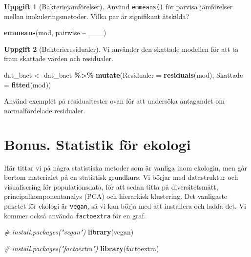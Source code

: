 \documentclass[
]{book}
\newenvironment{Shaded}{\begin{snugshade}}{\end{snugshade}}
\newcommand{\AttributeTok}[1]{\textcolor[rgb]{0.13,0.29,0.53}{#1}}
\newcommand{\CommentTok}[1]{\textcolor[rgb]{0.56,0.35,0.01}{\textit{#1}}}
\newcommand{\FunctionTok}[1]{\textcolor[rgb]{0.13,0.29,0.53}{\textbf{#1}}}
\newcommand{\NormalTok}[1]{#1}
\newcommand{\OtherTok}[1]{\textcolor[rgb]{0.56,0.35,0.01}{#1}}
\newcommand{\SpecialCharTok}[1]{\textcolor[rgb]{0.81,0.36,0.00}{\textbf{#1}}}
\theoremstyle{definition}
\theoremstyle{definition}
\theoremstyle{definition}
\newtheorem{exercise}{Uppgift}[chapter]
\theoremstyle{definition}
\theoremstyle{remark}
\begin{document}
\begin{exercise}[Bakteriejämförelser]

Använd \texttt{emmeans()} för parvisa jämförelser mellan inokuleringsmetoder. Vilka par är signifikant åtskilda?

\begin{Shaded}
\begin{Highlighting}[]
\FunctionTok{emmeans}\NormalTok{(mod, pairwise }\SpecialCharTok{\textasciitilde{}}\NormalTok{ \_\_\_)}
\end{Highlighting}
\end{Shaded}

\end{exercise}

\begin{exercise}[Bakterieresidualer]
Vi använder den skattade modellen för att ta fram skattade värden och residualer.

\begin{Shaded}
\begin{Highlighting}[]
\NormalTok{dat\_bact }\OtherTok{\textless{}{-}}\NormalTok{ dat\_bact }\SpecialCharTok{\%\textgreater{}\%} 
  \FunctionTok{mutate}\NormalTok{(}\AttributeTok{Residualer =} \FunctionTok{residuals}\NormalTok{(mod),}
         \AttributeTok{Skattade =} \FunctionTok{fitted}\NormalTok{(mod))}
\end{Highlighting}
\end{Shaded}

Använd exemplet på residualtester ovan för att undersöka antagandet om normalfördelade residualer.
\end{exercise}

\section{Bonus. Statistik för ekologi}\label{bonus.-statistik-fuxf6r-ekologi}

Här tittar vi på några statistiska metoder som är vanliga inom ekologin, men går bortom materialet på en statistisk grundkurs. Vi börjar med datastruktur och visualisering för populationsdata, för att sedan titta på diversitetsmått, principalkomponentanalys (PCA) och hierarkisk klustering. Det vanligaste paketet för ekologi är \texttt{vegan}, så vi kan börja med att installera och ladda det. Vi kommer också använda \texttt{factoextra} för en graf.

\begin{Shaded}
\begin{Highlighting}[]
\CommentTok{\# install.packages("vegan")}
\FunctionTok{library}\NormalTok{(vegan)}

\CommentTok{\# install.packages("factoextra")}
\FunctionTok{library}\NormalTok{(factoextra)}
\end{Highlighting}
\end{Shaded}
\end{document}
